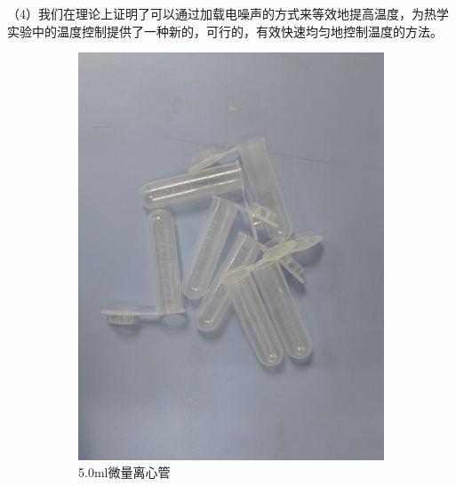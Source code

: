 \documentclass[a4paper]{report} %
\begin{document}
（4）我们在理论上证明了可以通过加载电噪声的方式来等效地提高温度，为热学实验中的温度控制提供了一种新的，可行的，有效快速均匀地控制温度的方法。
\begin{figure}[H]
    \centering
    \begin{subfigure}{0.22\textwidth}
        \includegraphics[width=\linewidth]{5.0ml微量离心管.jpg}
        \caption{5.0ml微量离心管}
    \end{subfigure}
    \begin{subfigure}{0.22\textwidth}

\end{subfigure}
\end{figure}
\end{document}
